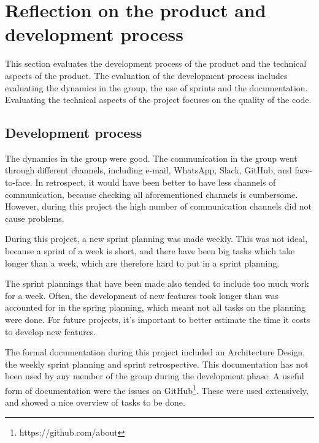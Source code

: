 \chapter{Reflection on the product and development process}
This section evaluates the development process of the product and the technical aspects of the product. The evaluation of the development process includes evaluating the dynamics in the group, the use of sprints and the documentation. Evaluating the technical aspects of the project focuses on the quality of the code. 

\section{Development process}
\par
The dynamics in the group were good. The communication in the group went through different channels, including e-mail, WhatsApp, Slack, GitHub, and face-to-face. In retrospect, it would have been better to have less channels of communication, because checking all aforementioned channels is cumbersome. However, during this project the high number of communication channels did not cause problems. 
\par
During this project, a new sprint planning was made weekly. This was not ideal, because a sprint of a week is short, and there have been big tasks which take longer than a week, which are therefore hard to put in a sprint planning. 
\par
The sprint plannings that have been made also tended to include too much work for a week. Often, the development of new features took longer than was accounted for in the spring planning, which meant not all tasks on the planning were done. For future projects, it’s important to better estimate the time it costs to develop new features.
\par
The formal documentation during this project included an Architecture Design, the weekly sprint planning and sprint retrospective. This documentation has not been used by any member of the group during the development phase. A useful form of documentation were the issues on GitHub\footnote{https://github.com/about}. These were used extensively, and showed a nice overview of tasks to be done. 

